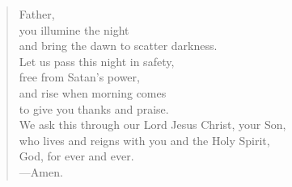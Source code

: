 \prayer

\setlength{\vleftmargin}{\prayerleftmargini}

\begin{verse}
Father,\\
you illumine the night\\
and bring the dawn to scatter darkness.\\
Let us pass this night in safety,\\
free from Satan’s power,\\
and rise when morning comes\\
to give you thanks and praise.\\
We ask this through our Lord Jesus Christ, your Son,\\
who lives and reigns with you and the Holy Spirit,\\
God, for ever and ever.\\
{\color{red}---\thinspace}Amen.
\end{verse}

\setlength{\vleftmargin}{\defleftmargini}